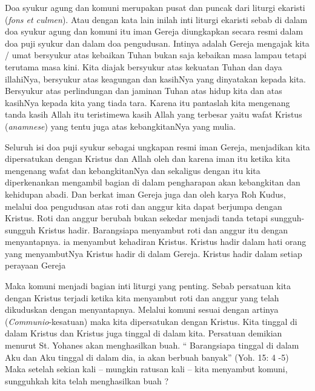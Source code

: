      Doa syukur agung dan komuni merupakan pusat dan puncak dari liturgi ekaristi (\textit{fons et culmen}). Atau dengan kata lain inilah inti liturgi ekaristi sebab di dalam doa syukur agung dan komuni itu iman Gereja diungkapkan secara resmi dalam doa puji syukur dan dalam doa pengudusan. Intinya adalah Gereja mengajak kita / umat bersyukur atas kebaikan Tuhan bukan saja kebaikan masa lampau tetapi terutama masa kini. Kita diajak bersyukur atas kekuatan Tuhan dan daya illahiNya, bersyukur atas keagungan dan kasihNya yang dinyatakan kepada kita. Bersyukur atas perlindungan dan jaminan Tuhan atas hidup kita dan atas kasihNya kepada kita yang tiada tara. Karena itu pantaslah kita  mengenang tanda kasih Allah itu teristimewa kasih Allah yang terbesar yaitu wafat Kristus (\textit{anamnese}) yang tentu juga atas kebangkitanNya yang mulia.

      Seluruh isi doa puji syukur sebagai ungkapan resmi iman Gereja, menjadikan kita dipersatukan dengan Kristus dan Allah oleh dan karena iman itu ketika kita mengenang wafat dan kebangkitanNya dan sekaligus dengan itu kita diperkenankan mengambil bagian di dalam pengharapan akan kebangkitan dan kehidupan abadi. Dan berkat iman Gereja juga dan oleh karya Roh Kudus, melalui doa pengudusan atas roti dan anggur kita dapat berjumpa dengan Kristus. Roti dan anggur berubah bukan sekedar menjadi tanda tetapi sungguh-sungguh Kristus hadir. Barangsiapa menyambut roti dan anggur itu dengan menyantapnya. ia menyambut kehadiran Kristus. Kristus hadir dalam hati orang yang menyambutNya Kristus hadir di dalam Gereja. Kristus hadir dalam setiap perayaan Gereja

      Maka komuni menjadi bagian inti liturgi yang penting. Sebab persatuan kita dengan Kristus terjadi ketika kita menyambut roti dan anggur yang telah dikuduskan dengan menyantapnya.  Melalui komuni sesuai dengan artinya (\textit{Communio}-kesatuan) maka kita dipersatukan dengan Kristus. Kita tinggal di dalam Kristus dan Kristus juga tinggal di dalam kita. Persatuan demikian menurut St. Yohanes akan menghasilkan buah. `` Barangsiapa tinggal di dalam Aku dan Aku tinggal di dalam dia, ia akan berbuah banyak'' (Yoh. 15: 4 -5) Maka setelah sekian kali -- mungkin ratusan kali -- kita menyambut komuni, sungguhkah kita telah menghasilkan buah ?


